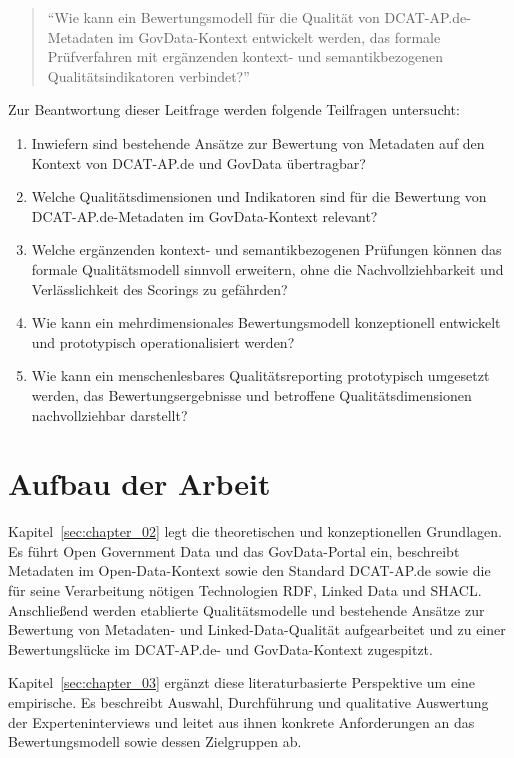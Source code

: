 \begin{quote}
\enquote{Wie kann ein Bewertungsmodell für die Qualität von DCAT-AP.de-Metadaten im GovData-Kontext entwickelt werden, das formale Prüfverfahren mit ergänzenden kontext- und semantikbezogenen Qualitätsindikatoren verbindet?}
\end{quote}

Zur Beantwortung dieser Leitfrage werden folgende Teilfragen untersucht:

\begin{enumerate}
    \item Inwiefern sind bestehende Ansätze zur Bewertung von Metadaten auf den Kontext von DCAT-AP.de und GovData übertragbar?

    \item Welche Qualitätsdimensionen und Indikatoren sind für die Bewertung von DCAT-AP.de-Metadaten im GovData-Kontext relevant?

    \item Welche ergänzenden kontext- und semantikbezogenen Prüfungen können das formale Qualitätsmodell sinnvoll erweitern, ohne die Nachvollziehbarkeit und \\ Verlässlichkeit des Scorings zu gefährden?

    \item Wie kann ein mehrdimensionales Bewertungsmodell konzeptionell entwickelt und prototypisch operationalisiert werden?

    \item Wie kann ein menschenlesbares Qualitätsreporting prototypisch umgesetzt werden, das Bewertungsergebnisse und betroffene Qualitätsdimensionen nachvollziehbar darstellt?
\end{enumerate}

\section{Aufbau der Arbeit}

Kapitel~\ref{sec:chapter_02} legt die theoretischen und konzeptionellen
Grundlagen. Es führt Open Government Data und das GovData-Portal ein, beschreibt
Metadaten im Open-Data-Kontext sowie den Standard DCAT-AP.de sowie die für seine
Verarbeitung nötigen Technologien RDF, Linked Data und SHACL. Anschließend
werden etablierte Qualitätsmodelle und bestehende Ansätze zur Bewertung von
Metadaten- und Linked-Data-Qualität aufgearbeitet und zu einer Bewertungslücke
im DCAT-AP.de- und GovData-Kontext zugespitzt.

Kapitel~\ref{sec:chapter_03} ergänzt diese literaturbasierte Perspektive um eine
empirische. Es beschreibt Auswahl, Durchführung und qualitative Auswertung der
Experteninterviews und leitet aus ihnen konkrete Anforderungen an das
Bewertungsmodell sowie dessen Zielgruppen ab.


